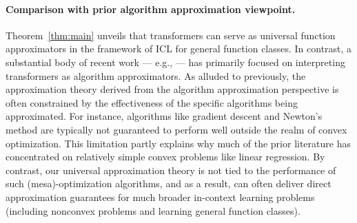 \documentclass[english]{article}
\begin{document}
     



    

\paragraph{Comparison with prior algorithm approximation viewpoint.} 
Theorem~\ref{thm:main} unveils that transformers can serve as universal function approximators in the framework of ICL for general function classes.  
  In contrast, a substantial body of recent work --- e.g., \citet{von2023transformers,von2023uncovering,bai2023transformers,ahn2023transformers,giannou2023looped,xie2022explanation,cheng2024transformers} --- has primarily focused on interpreting transformers as algorithm approximators. As alluded to previously, the approximation theory derived from the algorithm approximation perspective is often constrained  by the effectiveness of the specific algorithms being approximated. For instance, algorithms like gradient descent and Newton's method are typically not guaranteed to perform well outside the realm of convex optimization. This limitation partly explains why much of the prior literature has concentrated on relatively simple convex problems like linear regression. 
		By contrast, our universal approximation theory is not tied to the performance of such (mesa)-optimization algorithms, and as a result,  can often deliver direct approximation guarantees for much broader in-context learning problems (including nonconvex problems and learning general function classes). 
%
\end{document}
